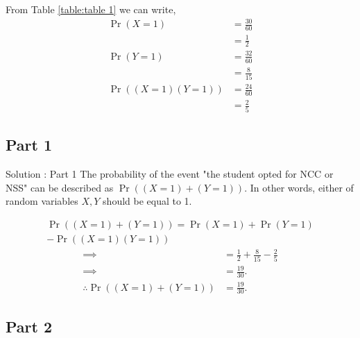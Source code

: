 \documentclass{beamer}
\providecommand{\pr}[1]{\ensuremath{\Pr\left(#1\right)}}
\providecommand{\brak}[1]{\ensuremath{\left(#1\right)}}
\begin{document}
        From Table \ref{table:table 1} we can write,
          \begin{align}
               \pr{X = 1} &= \frac{30}{60} \\
                               &=\frac{1}{2}\\
               \pr{Y = 1} &= \frac{32}{60} \\
                               &= \frac{8}{15}\label{eq:4}\\
               \pr{\brak{X = 1}\brak{Y=1}} &= \frac{24}{60}\\
                                                         &= \frac{2}{5}\label{eq:6}
          \end{align}
 \subsection{Part 1}
     
\begin{frame}{Solution : Part 1}
      The probability of the event "the student opted for NCC or NSS" can be described as $\pr{\brak{X = 1} + \brak{Y = 1}}$. In other words, either of random variables 
                $X,Y$ should be equal to 1.
                  
                   \begin{equation}
                   \begin{split}
                      \pr{\brak{X = 1} + \brak{Y = 1}} = \pr{X=1}+\pr{Y=1}\\
                                                                                    -\pr{\brak{X = 1}\brak{Y=1}}
                    \end{split}
                   \end{equation}
                  \begin{align}
                        \implies      &= \frac{1}{2} + \frac{8}{15}  - \frac{2}{5}\\
                        \implies      &= \frac{19}{30}.\\
                    \therefore \pr{\brak{X = 1} + \brak{Y = 1}} &= \frac{19}{30}.\label{eq:10}
                    \end{align}
\end{frame} 
\subsection{Part 2}
\end{document}
